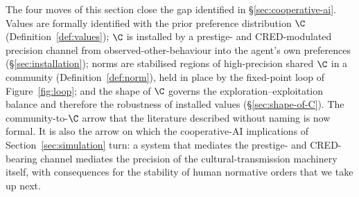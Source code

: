 The four moves of this section close the gap identified in \S\ref{sec:cooperative-ai}.
Values are formally identified with the prior preference distribution $\C$
(Definition~\ref{def:values}); $\C$ is installed by a
prestige- and CRED-modulated precision channel from observed-other-behaviour
into the agent's own preferences (\S\ref{sec:installation}); norms are
stabilised regions of high-precision shared $\C$ in a community
(Definition~\ref{def:norm}), held in place by the fixed-point loop of
Figure~\ref{fig:loop}; and the shape of $\C$ governs the exploration--exploitation
balance and therefore the robustness of installed values
(\S\ref{sec:shape-of-C}). The community-to-$\C$ arrow that the literature
described without naming is now formal. It is also the arrow on which the
cooperative-AI implications of Section~\ref{sec:simulation} turn: a system that
mediates the prestige- and CRED-bearing channel mediates the precision of
the cultural-transmission machinery itself, with consequences for the
stability of human normative orders that we take up next.
